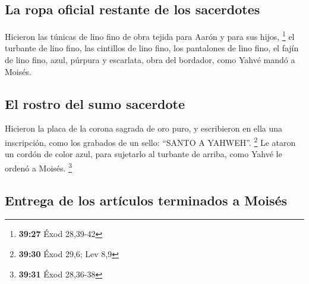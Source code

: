 \begin{paracol}{2}
\hypertarget{la-ropa-oficial-restante-de-los-sacerdotes}{%
\subsection{La ropa oficial restante de los
sacerdotes}\label{la-ropa-oficial-restante-de-los-sacerdotes}}

 Hicieron las túnicas de lino fino de obra tejida para
Aarón y para sus hijos, \footnote{\textbf{39:27} Éxod 28,39-42}
 el turbante de lino fino, las cintillos de lino fino,
los pantalones de lino fino,  el fajín de lino fino,
azul, púrpura y escarlata, obra del bordador, como Yahvé mandó a Moisés.

\hypertarget{el-rostro-del-sumo-sacerdote}{%
\subsection{El rostro del sumo
sacerdote}\label{el-rostro-del-sumo-sacerdote}}

 Hicieron la placa de la corona sagrada de oro puro, y
escribieron en ella una inscripción, como los grabados de un sello:
``SANTO A YAHWEH''. \footnote{\textbf{39:30} Éxod 29,6; Lev 8,9}
 Le ataron un cordón de color azul, para sujetarlo al
turbante de arriba, como Yahvé le ordenó a Moisés. \footnote{\textbf{39:31}
  Éxod 28,36-38}

\hypertarget{entrega-de-los-artuxedculos-terminados-a-moisuxe9s}{%
\subsection{Entrega de los artículos terminados a
Moisés}\label{entrega-de-los-artuxedculos-terminados-a-moisuxe9s}}


\end{paracol}
